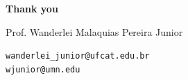\begin{frame}[plain]

\vspace{1.2cm}



{\Large\bfseries Thank you}




{\normalsize
Prof. Wanderlei Malaquias Pereira Junior
}

\vspace{0.5cm}

{\small
\texttt{wanderlei\_junior@ufcat.edu.br}\\
\texttt{wjunior@umn.edu}
}

\vfill

\end{frame}
